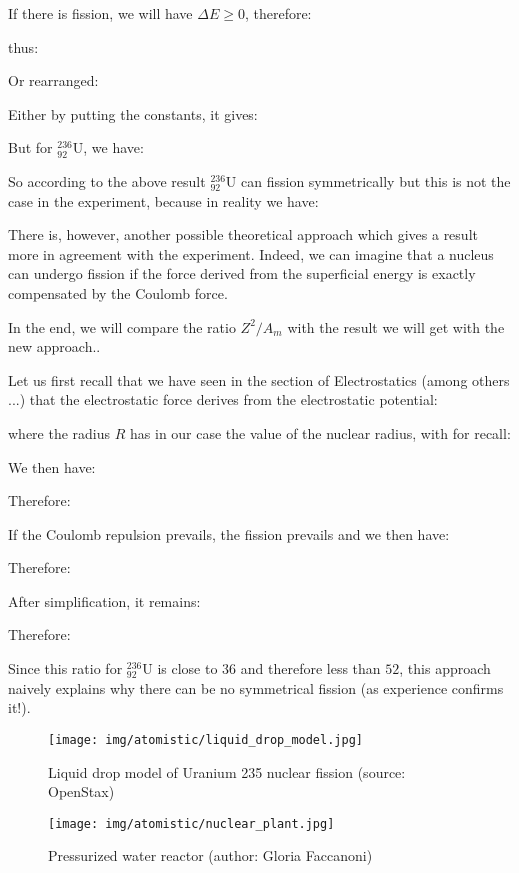 	
	\begin{tcolorbox}[colframe=black,colback=white,sharp corners]
	If there is fission, we will have $\Delta E\ge 0$, therefore:
	
	thus:
	
	Or rearranged:
	
	Either by putting the constants, it gives:
	
	But for $_{92}^{236}\mathrm{U}$, we have:
	
	So according to the above result $_{92}^{236}\mathrm{U}$ can fission symmetrically but this is not the case in the experiment, because in reality we have:
	
	\end{tcolorbox}
	There is, however, another possible theoretical approach which gives a result more in agreement with the experiment. Indeed, we can imagine that a nucleus can undergo fission if the force derived from the superficial energy is exactly compensated by the Coulomb force.

	In the end, we will compare the ratio $Z^2/A_m$ with the result we will get with the new approach..

	Let us first recall that we have seen in the section of Electrostatics (among others ...) that the electrostatic force derives from the electrostatic potential:
	
	where the radius $R$ has in our case the value of the nuclear radius, with for recall:
	
	We then have:
	
	Therefore:
	
	If the Coulomb repulsion prevails, the fission prevails and we then have:
	
	Therefore:
	
	After simplification, it remains:
	
	Therefore:
	
	Since this ratio for $_{92}^{236}\mathrm{U}$ is close to $36$ and therefore less than $52$, this approach naively explains why there can be no symmetrical fission (as experience confirms it!).
	
	\begin{figure}[H]
		\centering
		\texttt{[image: img/atomistic/liquid\_drop\_model.jpg]}
		\caption{Liquid drop model of Uranium 235 nuclear fission (source: OpenStax)}
	\end{figure}
	
	\begin{figure}[H]
		\centering
		\texttt{[image: img/atomistic/nuclear\_plant.jpg]}
		\caption{Pressurized water reactor (author: Gloria Faccanoni)}
	\end{figure}
	
